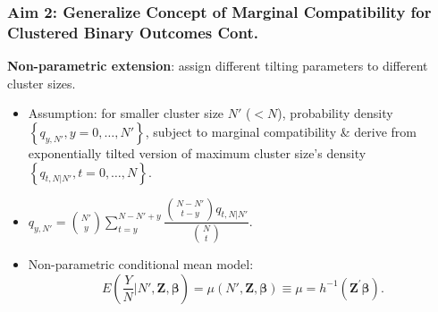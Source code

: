 \documentclass[hyperref={bookmarks=false},aspectratio=169]{beamer}
\begin{document}
\begin{frame}
\frametitle{Aim 2: Generalize Concept of Marginal Compatibility for Clustered Binary Outcomes Cont.}

\textbf{Non-parametric extension}: assign different tilting parameters to different cluster sizes.

\begin{itemize}
    \item \alert{Assumption}: for smaller cluster size $N'$ ($<N$), probability density $\left\lbrace q_{y,N'}, y = 0, \dots, N' \right\rbrace$, subject to \alert{marginal compatibility} {\&} derive from exponentially tilted version of maximum cluster size's density $\left \lbrace q_{t,N|N'}, t=0,\dots, N\right\rbrace$.
    \item $q_{y,N'} =\binom{N'}{y} \displaystyle \sum_{t=y}^{N-N'+y} \dfrac{\binom{N-N'}{t-y} q_{t,N|N'}}{\binom{N}{t}}$.
    \item \alert{Non-parametric conditional mean model}:
    \begin{equation*}\label{M:NONparametricSPGLM_GMCconditionalMean}
    E\left( \frac{Y}{N} | N', \boldsymbol{Z}, \boldsymbol{\beta} \right) = \mu(N', \boldsymbol{Z}, \boldsymbol{\beta})  \equiv \mu = h^{-1} \left( \boldsymbol{Z}^{'} \boldsymbol{\beta} \right) .
    \end{equation*}
\end{itemize}

\end{frame}
\end{document}
